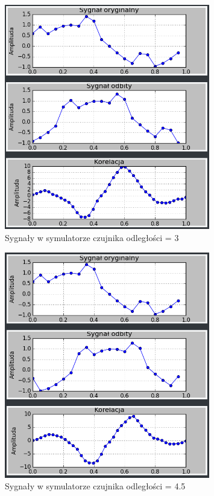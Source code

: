 \documentclass{article}
\begin{document}
{{\begin{figure}[h!]
                \includegraphics[width=0.8\textwidth]{img/sim18.png}
                \caption{Sygnały w symulatorze czujnika odległości = 3}
            \end{figure}
            \begin{figure}[h!]
                \centering
                \includegraphics[width=0.8\textwidth]{img/sim19.png}
                \caption{Sygnały w symulatorze czujnika odległości = 4.5}

\end{figure}}}
\end{document}
